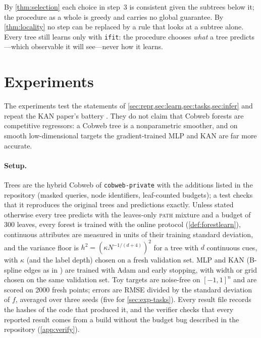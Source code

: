\documentclass[11pt]{article}
\theoremstyle{definition}
\theoremstyle{remark}
\begin{document}
By \cref{thm:selection} each choice in step~3 is consistent given the subtrees below it;
the procedure as a whole is greedy and carries no global guarantee.  By
\cref{thm:locality} no step can be replaced by a rule that looks at a subtree alone.
Every tree still learns only with \texttt{ifit}: the procedure chooses \emph{what} a tree
predicts---which observable it will see---never how it learns.

\section{Experiments}\label{sec:experiments}

The experiments test the statements of \cref{sec:repr,sec:learn,sec:tasks,sec:infer}
and repeat the KAN paper's battery \citep{liu2024kan}.  They do not claim that Cobweb
forests are competitive regressors: a Cobweb tree is a nonparametric smoother, and on
smooth low-dimensional targets the gradient-trained MLP and KAN are far more accurate.

\paragraph{Setup.}
Trees are the hybrid Cobweb of \texttt{cobweb-private} with the additions listed in the
repository (masked queries, node identifiers, leaf-counted budgets); a test checks that
it reproduces the original trees and predictions exactly.  Unless stated otherwise every
tree predicts with the leaves-only \textsc{path} mixture and a budget of 300 leaves,
every forest is trained with the online protocol (\cref{def:forestlearn}), continuous
attributes are measured in units of their training standard deviation, and the variance
floor is $h^2=(\kappa N^{-1/(d+4)})^2$ for a tree with $d$ continuous cues, with
$\kappa$ (and the label depth) chosen on a fresh validation set.  MLP and KAN (B-spline
edges as in \citet{liu2024kan}) are trained with Adam and early stopping, with width or
grid chosen on the same validation set.  Toy targets are noise-free on $[-1,1]^n$ and
are scored on 2000 fresh points; errors are RMSE divided by the standard deviation of
$f$, averaged over three seeds (five for \cref{sec:exp-tasks}).  Every result file
records the hashes of the code that produced it, and the verifier checks that every
reported result comes from a build without the budget bug described in the repository
(\cref{app:verify}).
\end{document}
